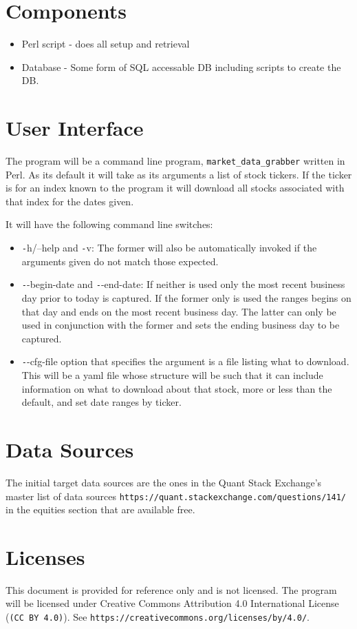 \documentclass{report}
\begin{document}
\section{Components}

\begin{itemize}
    \item Perl script - does all setup and retrieval
    \item Database - Some form of SQL accessable DB including scripts to create
          the DB.
\end{itemize}

\section{User Interface}

The program will be a command line program, \texttt{market\_data\_grabber} written in
Perl.  As its default it will take as its arguments a list of stock tickers.  If the
ticker is for an index known to the program it will download all stocks associated
with that index for the dates given.

It will have the following command line switches:
\begin{itemize}
    \item {\texttt -h/--help} and {\texttt -v}: The former will also be automatically
        invoked if the arguments given do not match those expected.

    \item {\texttt --begin-date} and {\texttt --end-date}: If neither is used only 
        the most recent business day prior to today is captured.  If the former only
        is used the ranges begins on that day and ends on the most recent business
        day.  The latter can only be used in conjunction with the former and sets 
        the ending business day to be captured.

    \item {\texttt --cfg-file} option that specifies the argument is a file listing 
        what to download.  This will be a yaml file whose structure will be such that
        it can include information on what to download about that stock, more or less
        than the default, and set date ranges by ticker.
\end{itemize}

\section{Data Sources}

The initial target data sources are the ones in the Quant Stack Exchange's master 
list of data sources \texttt{https://quant.stackexchange.com/questions/141/}
in the equities section that are available free.

\section{Licenses}

This document is provided for reference only and is not licensed.  The program will
be licensed under Creative Commons Attribution 4.0 International License 
(\texttt{(CC BY 4.0)}).  See \texttt{https://creativecommons.org/licenses/by/4.0/}.
\end{document}
